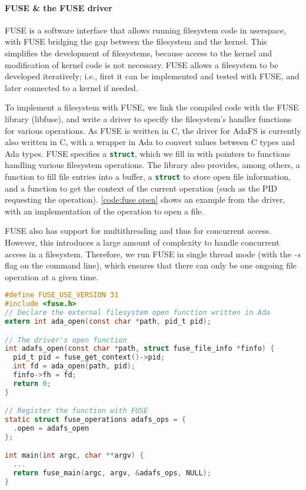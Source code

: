 \paragraph{FUSE \& the FUSE driver}
FUSE is a software interface that allows running filesystem code in userspace, with FUSE bridging the gap between the filesystem and the kernel.
This simplifies the development of filesystems, because access to the kernel and modification of kernel code is not necessary.
FUSE allows a filesystem to be developed iteratively; i.e., first it can be implemented and tested with FUSE, and later connected to a kernel if needed.

To implement a filesystem with FUSE, we link the compiled code with the FUSE library (libfuse), and write a driver to specify the filesystem's handler functions for various operations.
As FUSE is written in C, the driver for AdaFS is currently also written in C, with a wrapper in Ada to convert values between C types and Ada types.
FUSE specifies a \lstinline[language=C]{struct}, which we fill in with pointers to functions handling various filesystem operations.
The library also provides, among others, a function to fill file entries into a buffer, a \lstinline[language=C]{struct} to store open file information, and a function to get the context of the current operation (such as the PID requesting the operation).
\autoref{code:fuse open} shows an example from the driver, with an implementation of the operation to open a file.

FUSE also has support for multithreading and thus for concurrent access.
However, this introduces a large amount of complexity to handle concurrent access in a filesystem.
Therefore, we run FUSE in single thread mode (with the \textit{-s} flag on the command line), which ensures that there can only be one ongoing file operation at a given time.

\begin{lstlisting}[float=tb,caption={FUSE driver implementation of \textnormal{open}.}, label={code:fuse open}, language=C]
#define FUSE_USE_VERSION 31
#include <fuse.h>
// Declare the external filesystem open function written in Ada
extern int ada_open(const char *path, pid_t pid);

// The driver's open function
int adafs_open(const char *path, struct fuse_file_info *finfo) {
  pid_t pid = fuse_get_context()->pid;
  int fd = ada_open(path, pid);
  finfo->fh = fd;
  return 0;
}

// Register the function with FUSE
static struct fuse_operations adafs_ops = {
  .open = adafs_open
};

int main(int argc, char **argv) {
  ...
  return fuse_main(argc, argv, &adafs_ops, NULL);
}
\end{lstlisting}

